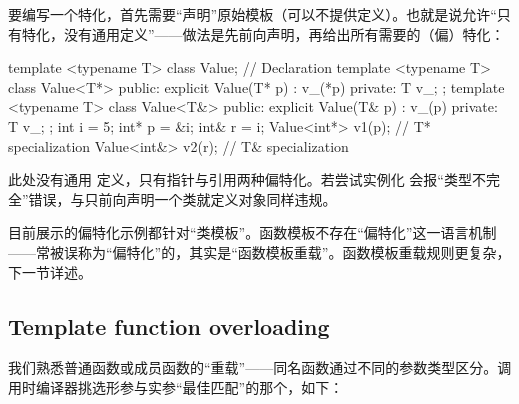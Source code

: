 要编写一个特化，首先需要“声明”原始模板（可以不提供定义）。也就是说允许“只有特化，没有通用定义”——做法是先前向声明，再给出所有需要的（偏）特化：

\begin{code}
template <typename T> class Value; // Declaration 
template <typename T> class Value<T*> {
  public:
  explicit Value(T* p) : v_(*p) {} private:
  T v_;
};
template <typename T> class Value<T&> {
  public:
  explicit Value(T& p) : v_(p) {}
  private:
  T v_;
};
int i = 5; int* p = &i; int& r = i;
Value<int*> v1(p); // T* specialization
Value<int&> v2(r); // T& specialization
\end{code}

此处没有通用  定义，只有指针与引用两种偏特化。若尝试实例化  会报“类型不完全”错误，与只前向声明一个类就定义对象同样违规。

目前展示的偏特化示例都针对“类模板”。函数模板不存在“偏特化”这一语言机制——常被误称为“偏特化”的，其实是“函数模板重载”。函数模板重载规则更复杂，下一节详述。

\subsection{Template function overloading}
我们熟悉普通函数或成员函数的“重载”——同名函数通过不同的参数类型区分。调用时编译器挑选形参与实参“最佳匹配”的那个，如下：

